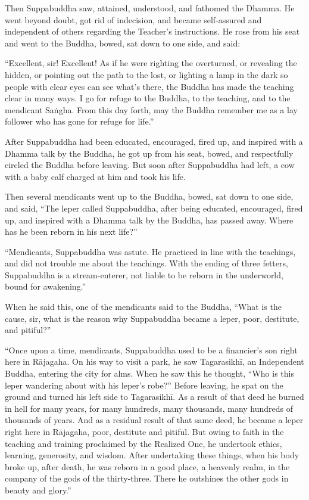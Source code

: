 \documentclass[12pt,openany]{book}%
\begin{document}
Then Suppabuddha saw, attained, understood, and fathomed the Dhamma. He went beyond doubt, got rid of indecision, and became self-assured and independent of others regarding the Teacher’s instructions. He rose from his seat and went to the Buddha, bowed, sat down to one side, and said: 

“Excellent, sir! Excellent! As if he were righting the overturned, or revealing the hidden, or pointing out the path to the lost, or lighting a lamp in the dark so people with clear eyes can see what’s there, the Buddha has made the teaching clear in many ways. I go for refuge to the Buddha, to the teaching, and to the mendicant \textsanskrit{Saṅgha}. From this day forth, may the Buddha remember me as a lay follower who has gone for refuge for life.” 

After Suppabuddha had been educated, encouraged, fired up, and inspired with a Dhamma talk by the Buddha, he got up from his seat, bowed, and respectfully circled the Buddha before leaving. But soon after Suppabuddha had left, a cow with a baby calf charged at him and took his life. 

Then several mendicants went up to the Buddha, bowed, sat down to one side, and said, “The leper called Suppabuddha, after being educated, encouraged, fired up, and inspired with a Dhamma talk by the Buddha, has passed away. Where has he been reborn in his next life?” 

“Mendicants, Suppabuddha was astute. He practiced in line with the teachings, and did not trouble me about the teachings. With the ending of three fetters, Suppabuddha is a stream-enterer, not liable to be reborn in the underworld, bound for awakening.” 

When he said this, one of the mendicants said to the Buddha, “What is the cause, sir, what is the reason why Suppabuddha became a leper, poor, destitute, and pitiful?” 

“Once upon a time, mendicants, Suppabuddha used to be a financier’s son right here in \textsanskrit{Rājagaha}. On his way to visit a park, he saw \textsanskrit{Tagarasikhī}, an Independent Buddha, entering the city for alms. When he saw this he thought, “Who is this leper wandering about with his leper’s robe?” Before leaving, he spat on the ground and turned his left side to \textsanskrit{Tagarasikhī}. As a result of that deed he burned in hell for many years, for many hundreds, many thousands, many hundreds of thousands of years. And as a residual result of that same deed, he became a leper right here in \textsanskrit{Rājagaha}, poor, destitute and pitiful. But owing to faith in the teaching and training proclaimed by the Realized One, he undertook ethics, learning, generosity, and wisdom. After undertaking these things, when his body broke up, after death, he was reborn in a good place, a heavenly realm, in the company of the gods of the thirty-three. There he outshines the other gods in beauty and glory.” 
\end{document}
